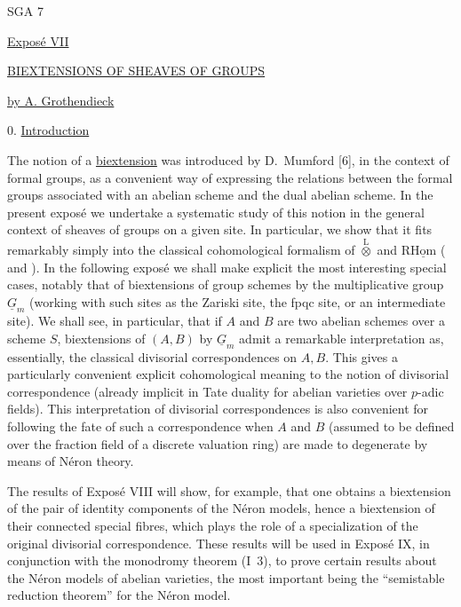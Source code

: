 

\begin{center}
SGA 7

\vspace{1em}
\underline{Expos\'e VII}

\vspace{1em}
\underline{\underline{BIEXTENSIONS OF SHEAVES OF GROUPS}}

\vspace{1em}
\underline{by A. Grothendieck}
\end{center}

0. \underline{Introduction}

The notion of a \underline{biextension} was introduced by D.~Mumford
[6], in the context of formal groups, as a convenient way of expressing
the relations between the formal groups associated with an abelian scheme
and the dual abelian scheme. In the present expos\'e we undertake a
systematic study of this notion in the general context of sheaves of
groups on a given site. In particular, we show that it fits remarkably
simply into the classical cohomological formalism of
$\overset{\mathrm L}{\otimes}$ and $\mathrm R\underline{\mathrm{Hom}}$
( and ). In the following expos\'e we shall make explicit the
most interesting special cases, notably that of biextensions of group
schemes by the multiplicative group $\underline G_m$ (working with such
sites as the Zariski site, the fpqc site, or an intermediate site). We
shall see, in particular, that if $A$ and $B$ are two abelian schemes over
a scheme $S$, biextensions of $(A,B)$ by $\underline G_m$ admit a
remarkable interpretation as, essentially, the classical divisorial
correspondences on $A,B$. This gives a particularly convenient explicit
cohomological meaning to the notion of divisorial correspondence (already
implicit in Tate duality for abelian varieties over $p$-adic fields).
This interpretation of divisorial correspondences is also convenient for
following the fate of such a correspondence when $A$ and $B$ (assumed to
be defined over the fraction field of a discrete valuation ring) are made
to degenerate by means of N\'eron theory.


The results of Expos\'e VIII will show, for example, that one obtains a
biextension of the pair of identity components of the N\'eron models,
hence a biextension of their connected special fibres, which plays the
role of a specialization of the original divisorial correspondence.
These results will be used in Expos\'e IX, in conjunction with the
monodromy theorem (I~3), to prove certain results about the N\'eron models
of abelian varieties, the most important being the ``semistable reduction
theorem'' for the N\'eron model.

